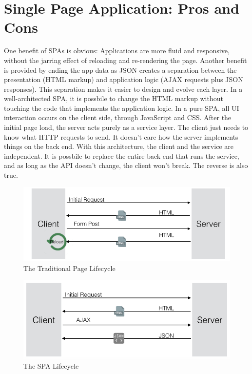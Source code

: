 \section{Single Page Application: Pros and Cons}
\label{sec:ARC_overview}

One benefit of SPAs is obvious: Applications are more fluid and responsive, without the jarring effect of reloading and re-rendering the page.
Another benefit is provided by ending the app data as JSON creates a separation between the presentation (HTML markup) and application logic (AJAX requests plus JSON responses).
This separation makes it easier to design and evolve each layer. In a well-architected SPA, it is possbile to change the HTML markup without touching the code that implements the application logic.
In a pure SPA, all UI interaction occurs on the client side, through JavaScript and CSS. After the initial page load, the server acts purely as a service layer. The client just needs to know what HTTP requests to send. It doesn’t care how the server implements things on the back end.
With this architecture, the client and the service are independent. It is possbile to replace the entire back end that runs the service, and as long as the API doesn’t change, the client won’t break. The reverse is also true.

\begin {figure}[h]
\graphicspath{{images/chapter_arc/}}
\includegraphics[width=\textwidth]{trad_life}
\caption{The Traditional Page Lifecycle}
\end {figure}


\begin {figure}[h]
\graphicspath{{images/chapter_arc/}}
\includegraphics[width=\textwidth]{spa_life}
\caption{The SPA Lifecycle}
\end {figure}



